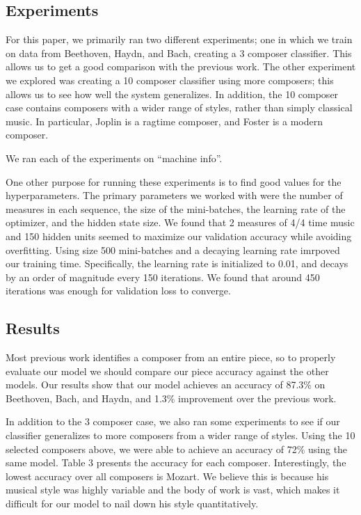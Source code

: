 \documentclass[11pt,a4paper]{article}
\begin{document}
\subsection{Experiments}
For this paper, we primarily ran two different experiments; one in which we train on data from Beethoven, Haydn, and Bach, creating a 3 composer classifier. This allows us to get a good comparison with the previous work. The other experiment we explored was creating a 10 composer classifier using more composers; this allows us to see how well the system generalizes. In addition, the 10 composer case contains composers with a wider range of styles, rather than simply classical music. In particular, Joplin is a ragtime composer, and Foster is a modern composer.

We ran each of the experiments on ``machine info''.

One other purpose for running these experiments is to find good values for the hyperparameters. The primary parameters we worked with were the number of measures in each sequence, the size of the mini-batches, the learning rate of the optimizer, and the hidden state size. We found that 2 measures of 4/4 time music and 150 hidden units seemed to maximize our validation accuracy while avoiding overfitting. Using size 500 mini-batches and a decaying learning rate imrpoved our training time. Specifically, the learning rate is initialized to 0.01, and decays by an order of magnitude every 150 iterations. We found that around 450 iterations was enough for validation loss to converge.


\subsection{Results}
Most previous work identifies a composer from an entire piece, so to properly evaluate our model we should compare our piece accuracy against the other models. Our results show that our model achieves an accuracy of 87.3\% on Beethoven, Bach, and Haydn, and 1.3\% improvement over the previous work. %

In addition to the 3 composer case, we also ran some experiments to see if our classifier generalizes to more composers from a wider range of styles. Using the 10 selected composers above, we were able to achieve an accuracy of 72\% using the same model. Table 3 presents the accuracy for each composer. Interestingly, the lowest accuracy over all composers is Mozart. We believe this is because his musical style was highly variable and the body of work is vast, which makes it difficult for our model to nail down his style quantitatively.
\end{document}
